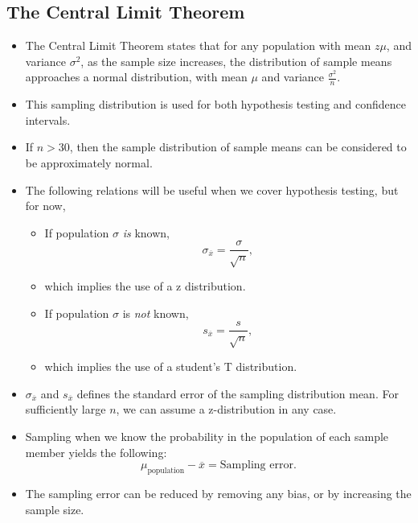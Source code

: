\documentclass[../notes_compiled.tex]{subfiles}
\begin{document}
\subsection{The Central Limit Theorem}
\begin{itemize}
\item The Central Limit Theorem states that for any population with mean $z\mu$, and variance $\sigma^{2}$, as the sample size increases, the distribution of sample means approaches a normal distribution, with mean $\mu$ and variance $\frac{\sigma^{2}}{n}$.
\item This sampling distribution is used for both hypothesis testing and confidence intervals.
\item If $n>30$, then the sample distribution of sample means can be considered to be approximately normal.
\item The following relations will be useful when we cover hypothesis testing, but for now, 
\begin{itemize}
\item If population $\sigma$ \emph{is} known,
\begin{equation}
\sigma_{\overline{x}} = \frac{\sigma}{\sqrt{n}},\label{std-err-pop}
\end{equation}
\item[] which implies the use of a z distribution.
\item If population $\sigma$ is \emph{not} known,
\begin{equation}
s_{\overline{x}} = \frac{s}{\sqrt{n}},\label{std-err-smp}
\end{equation}
\item[] which implies the use of a student's T distribution.
\end{itemize}
\item[] $\sigma_{\overline{x}}$ and $s_{\overline{x}}$ defines the standard error of the sampling distribution mean. For sufficiently large $n$, we can assume a z-distribution in any case.
\item Sampling when we know the probability in the population of each sample member yields the following:
\begin{equation}
\mu_{\text{population}} - \overline{x} = \text{Sampling error}.
\end{equation}
\item[] The sampling error can be reduced by removing any bias, or by increasing the sample size.
\end{itemize}
\end{document}
